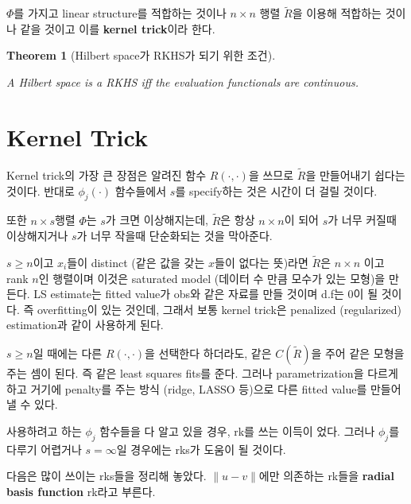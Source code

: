 \documentclass[
  letterpaper,
  DIV=11,
  numbers=noendperiod]{scrreprt}
\theoremstyle{definition}
\theoremstyle{plain}
\newtheorem{theorem}{Theorem}[chapter]
\theoremstyle{definition}
\theoremstyle{definition}
\theoremstyle{remark}
\begin{document}
\(\Phi\)를 가지고 linear structure를 적합하는 것이나 \(n \times n\) 행렬
\(\tilde{R}\)을 이용해 적합하는 것이나 같을 것이고 이를 \textbf{kernel
trick}이라 한다.

\begin{theorem}[Hilbert space가 RKHS가 되기 위한
조건]\protect\hypertarget{thm-hilbertRKHS}{}\label{thm-hilbertRKHS}

A Hilbert space is a RKHS iff the evaluation functionals are continuous.

\end{theorem}

\section{Kernel Trick}\label{kernel-trick}

Kernel trick의 가장 큰 장점은 알려진 함수 \(R(\cdot, \cdot)\)을 쓰므로
\(\tilde{R}\)을 만들어내기 쉽다는 것이다. 반대로 \(\phi_j (\cdot)\)
함수들에서 \(s\)를 specify하는 것은 시간이 더 걸릴 것이다.

또한 \(n\times s\)행렬 \(\Phi\)는 \(s\)가 크면 이상해지는데,
\(\tilde{R}\)은 항상 \(n\times n\)이 되어 \(s\)가 너무 커질때
이상해지거나 \(s\)가 너무 작을때 단순화되는 것을 막아준다.

\(s\geq n\)이고 \(x_i\)들이 distinct (같은 값을 갖는 \(x\)들이 없다는
뜻)라면 \(\tilde{R}\)은 \(n \times n\) 이고 rank \(n\)인 행렬이며 이것은
saturated model (데이터 수 만큼 모수가 있는 모형)을 만든다. LS
estimate는 fitted value가 obs와 같은 자료를 만들 것이며 d.f는 0이 될
것이다. 즉 overfitting이 있는 것인데, 그래서 보통 kernel trick은
penalized (regularized) estimation과 같이 사용하게 된다.

\(s\geq n\)일 때에는 다른 \(R(\cdot, \cdot)\)을 선택한다 하더라도, 같은
\(C(\tilde{R})\)을 주어 같은 모형을 주는 셈이 된다. 즉 같은 least
squares fits를 준다. 그러나 parametrization을 다르게 하고 거기에
penalty를 주는 방식 (ridge, LASSO 등)으로 다른 fitted value를 만들어낼
수 있다.

사용하려고 하는 \(\phi_j\) 함수들을 다 알고 있을 경우, rk를 쓰는 이득이
었다. 그러나 \(\phi_j\)를 다루기 어렵거나 \(s=\infty\)일 경우에는 rks가
도움이 될 것이다.

다음은 많이 쓰이는 rks들을 정리해 놓았다. \(\|u-v\|\)에만 의존하는
rk들을 \textbf{radial basis function} rk라고 부른다.
\end{document}
